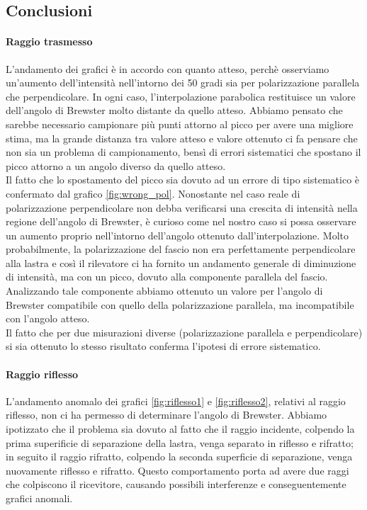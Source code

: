 \documentclass[letterpaper,12pt]{article}
\begin{document}
\subsection{Conclusioni}
\paragraph*{Raggio trasmesso} L'andamento dei grafici è in accordo con quanto atteso, perchè osserviamo
un'aumento dell'intensità nell'intorno dei 50 gradi sia per polarizzazione parallela che perpendicolare.
In ogni caso, l'interpolazione parabolica restituisce un valore dell'angolo di Brewster molto distante 
da quello atteso. Abbiamo pensato che sarebbe necessario campionare più punti attorno al picco 
per avere una migliore stima, ma la grande distanza tra valore atteso e valore ottenuto 
ci fa pensare che non sia un problema di campionamento, bensì di errori sistematici che spostano il picco attorno 
a un angolo diverso da quello atteso.\\
Il fatto che lo spostamento del picco sia dovuto ad un errore di tipo sistematico è confermato dal grafico 
\ref{fig:wrong_pol}. Nonostante nel caso reale di polarizzazione perpendicolare non debba verificarsi una crescita
di intensità nella regione dell'angolo di Brewster, è curioso come nel nostro caso si possa osservare un
aumento proprio nell'intorno dell'angolo ottenuto dall'interpolazione. Molto probabilmente, la 
polarizzazione del fascio non era perfettamente perpendicolare alla lastra e così il rilevatore ci ha fornito
un andamento generale di diminuzione di intensità, ma con un picco, dovuto alla componente parallela del fascio.
Analizzando tale componente abbiamo ottenuto un valore per l'angolo di Brewster compatibile con quello della
polarizzazione parallela, ma incompatibile con l'angolo atteso.\\
Il fatto che per due misurazioni diverse (polarizzazione parallela e perpendicolare) si sia ottenuto 
lo stesso risultato conferma l'ipotesi di errore sistematico.


\paragraph*{Raggio riflesso} L'andamento anomalo dei grafici \ref{fig:riflesso1} e \ref{fig:riflesso2}, relativi 
al raggio riflesso, non ci ha permesso di determinare l'angolo di Brewster. Abbiamo ipotizzato che il problema 
sia dovuto al fatto che il raggio incidente, colpendo la prima superificie di separazione della lastra, 
venga separato in riflesso e rifratto;  in seguito il raggio rifratto, colpendo la seconda superficie di separazione,
venga nuovamente riflesso e rifratto. Questo comportamento porta ad avere due raggi che colpiscono il ricevitore,
causando possibili interferenze e conseguentemente grafici anomali.\\
\end{document}
